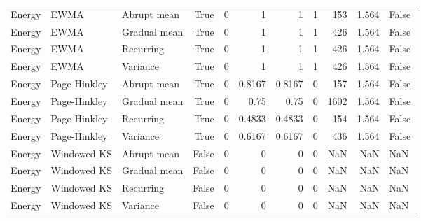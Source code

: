 \begin{tabular}{lllrrrrrrrl}
Energy & EWMA & Abrupt mean & True & 0 & 1 & 1 & 1 & 153 & 1.564 & False \\
Energy & EWMA & Gradual mean & True & 0 & 1 & 1 & 1 & 426 & 1.564 & False \\
Energy & EWMA & Recurring & True & 0 & 1 & 1 & 1 & 426 & 1.564 & False \\
Energy & EWMA & Variance & True & 0 & 1 & 1 & 1 & 426 & 1.564 & False \\
Energy & Page-Hinkley & Abrupt mean & True & 0 & 0.8167 & 0.8167 & 0 & 157 & 1.564 & False \\
Energy & Page-Hinkley & Gradual mean & True & 0 & 0.75 & 0.75 & 0 & 1602 & 1.564 & False \\
Energy & Page-Hinkley & Recurring & True & 0 & 0.4833 & 0.4833 & 0 & 154 & 1.564 & False \\
Energy & Page-Hinkley & Variance & True & 0 & 0.6167 & 0.6167 & 0 & 436 & 1.564 & False \\
Energy & Windowed KS & Abrupt mean & False & 0 & 0 & 0 & 0 & NaN & NaN & NaN \\
Energy & Windowed KS & Gradual mean & False & 0 & 0 & 0 & 0 & NaN & NaN & NaN \\
Energy & Windowed KS & Recurring & False & 0 & 0 & 0 & 0 & NaN & NaN & NaN \\
Energy & Windowed KS & Variance & False & 0 & 0 & 0 & 0 & NaN & NaN & NaN \\
\bottomrule
\end{tabular}
